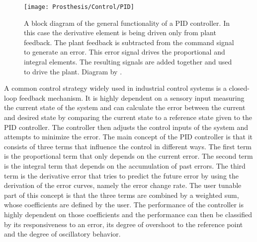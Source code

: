 \documentclass[main]{subfiles}
\begin{document}
\begin{figure}[htp]
\centering
\texttt{[image: Prosthesis/Control/PID]}
\caption[Diagram of general functionality of PID]{A block diagram of the general functionality of a PID controller. In this case the derivative element is being driven only from plant feedback. The plant feedback is subtracted from the command signal to generate an error. This error signal drives the proportional and integral elements. The resulting signals are added together and used to drive the plant. Diagram by \cite{PID}.}
\label{PID}
\end{figure}

A common control strategy widely used in industrial control systems is a closed-loop feedback mechanism. It is highly dependent on a sensory input measuring the current state of the system and can calculate the error between the current and desired state by comparing the current state to a reference state given to the PID controller. The controller then adjusts the control inputs of the system and attempts to minimize the error. The main concept of the PID controller is that it consists of three terms that influence the control in different ways. The first term is the proportional term that only depends on the current error. The second term is the integral term that depends on the accumulation of past errors. The third term is the derivative error that tries to predict the future error by using the derivation of the error curves, namely the error change rate. The user tunable part of this concept is that the three terms are combined by a weighted sum, whose coefficients are defined by the user. The performance of the controller is highly dependent on those coefficients and the performance can then be classified by its responsiveness to an error, its degree of overshoot to the reference point and the degree of oscillatory behavior.
\end{document}
